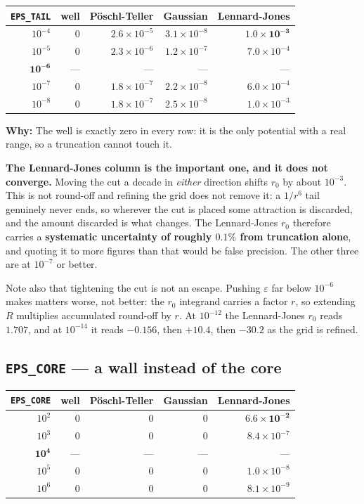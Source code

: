 \documentclass[11pt,a4paper]{article}
\newcommand{\why}[1]{\medskip\noindent\textbf{Why:} #1\medskip}
\begin{document}
\begin{center}\small
\begin{tabular}{rrrrr}
\toprule
\texttt{EPS\_TAIL} & well & Pöschl-Teller & Gaussian & Lennard-Jones \\
\midrule
$10^{-4}$ & $0$ & $2.6\times10^{-5}$ & $3.1\times10^{-8}$ & $\mathbf{1.0\times10^{-3}}$ \\
$10^{-5}$ & $0$ & $2.3\times10^{-6}$ & $1.2\times10^{-7}$ & $7.0\times10^{-4}$ \\
$\mathbf{10^{-6}}$ & --- & --- & --- & --- \\
$10^{-7}$ & $0$ & $1.8\times10^{-7}$ & $2.2\times10^{-8}$ & $6.0\times10^{-4}$ \\
$10^{-8}$ & $0$ & $1.8\times10^{-7}$ & $2.5\times10^{-8}$ & $1.0\times10^{-3}$ \\
\bottomrule
\end{tabular}
\end{center}

\why{The well is exactly zero in every row: it is the only potential with a real
range, so a truncation cannot touch it.

\textbf{The Lennard-Jones column is the important one, and it does not
converge.} Moving the cut a decade in \emph{either} direction shifts $r_0$ by
about $10^{-3}$. This is not round-off and refining the grid does not remove it:
a $1/r^6$ tail genuinely never ends, so wherever the cut is placed some
attraction is discarded, and the amount discarded is what changes. The
Lennard-Jones $r_0$ therefore carries a \textbf{systematic uncertainty of
roughly $0.1\%$ from truncation alone}, and quoting it to more figures than that
would be false precision. The other three are at $10^{-7}$ or better.

Note also that tightening the cut is not an escape. Pushing $\varepsilon$ far
below $10^{-6}$ makes matters worse, not better: the $r_0$ integrand carries a
factor $r$, so extending $R$ multiplies accumulated round-off by $r$. At
$10^{-12}$ the Lennard-Jones $r_0$ reads $1.707$, and at $10^{-14}$ it reads
$-0.156$, then $+10.4$, then $-30.2$ as the grid is refined.}

\subsection*{\texttt{EPS\_CORE} --- a wall instead of the core}

\begin{center}\small
\begin{tabular}{rrrrr}
\toprule
\texttt{EPS\_CORE} & well & Pöschl-Teller & Gaussian & Lennard-Jones \\
\midrule
$10^{2}$ & $0$ & $0$ & $0$ & $\mathbf{6.6\times10^{-2}}$ \\
$10^{3}$ & $0$ & $0$ & $0$ & $8.4\times10^{-7}$ \\
$\mathbf{10^{4}}$ & --- & --- & --- & --- \\
$10^{5}$ & $0$ & $0$ & $0$ & $1.0\times10^{-8}$ \\
$10^{6}$ & $0$ & $0$ & $0$ & $8.1\times10^{-9}$ \\
\bottomrule
\end{tabular}
\end{center}
\end{document}

